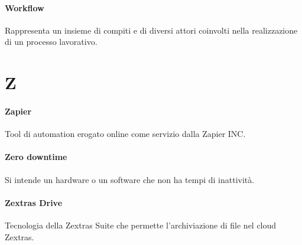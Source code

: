\documentclass[]{article}
\begin{document}
	\paragraph*{Workflow}
	Rappresenta un insieme di compiti e di diversi attori coinvolti nella realizzazione di un processo lavorativo.

	\newpage

	\section*{Z}

	\paragraph*{Zapier}
	Tool di automation erogato online come servizio dalla Zapier INC.

	\paragraph*{Zero downtime}
	Si intende un hardware o un software che non ha tempi di inattività.

	\paragraph*{Zextras Drive}
	Tecnologia della Zextras Suite che permette l'archiviazione di file nel cloud Zextras.
\end{document}
